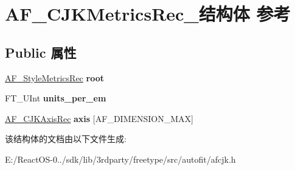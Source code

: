 \hypertarget{struct_a_f___c_j_k_metrics_rec__}{}\section{A\+F\+\_\+\+C\+J\+K\+Metrics\+Rec\+\_\+结构体 参考}
\label{struct_a_f___c_j_k_metrics_rec__}
\subsection*{Public 属性}
\begin{DoxyCompactItemize}
\item 
\mbox{\label{struct_a_f___c_j_k_metrics_rec___af67b3e8149149dfcb8cb8a328ba17642}} 
\hyperlink{struct_a_f___style_metrics_rec__}{A\+F\+\_\+\+Style\+Metrics\+Rec} {\bfseries root}
\item 
\mbox{\label{struct_a_f___c_j_k_metrics_rec___a447028a1e2b3e58a884acb29cbc80711}} 
F\+T\+\_\+\+U\+Int {\bfseries units\+\_\+per\+\_\+em}
\item 
\mbox{\label{struct_a_f___c_j_k_metrics_rec___aaa41d4ab74cb91cb6c4e5ae6bf471651}} 
\hyperlink{struct_a_f___c_j_k_axis_rec__}{A\+F\+\_\+\+C\+J\+K\+Axis\+Rec} {\bfseries axis} \mbox{[}A\+F\+\_\+\+D\+I\+M\+E\+N\+S\+I\+O\+N\+\_\+\+M\+AX\mbox{]}
\end{DoxyCompactItemize}


该结构体的文档由以下文件生成\+:\begin{DoxyCompactItemize}
\item 
E\+:/\+React\+O\+S-\/0../sdk/lib/3rdparty/freetype/src/autofit/afcjk.\+h\end{DoxyCompactItemize}
